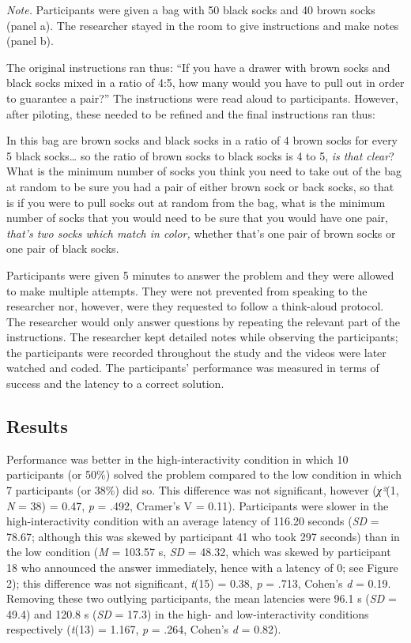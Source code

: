 \emph{Note.} Participants were given a bag with 50 black socks and 40
brown socks (panel a). The researcher stayed in the room to give
instructions and make notes (panel b).

The original instructions ran thus: ``If you have a drawer with brown
socks and black socks mixed in a ratio of 4:5, how many would you have
to pull out in order to guarantee a pair?'' The instructions were read
aloud to participants. However, after piloting, these needed to be
refined and the final instructions ran thus:

In this bag are brown socks and black socks in a ratio of 4 brown socks
for every 5 black socks\ldots{} so the ratio of brown socks to black
socks is 4 to 5, \emph{is that clear}? What is the minimum number of
socks you think you need to take out of the bag at random to be sure you
had a pair of either brown sock or back socks, so that is if you were to
pull socks out at random from the bag, what is the minimum number of
socks that you would need to be sure that you would have one pair,
\emph{that's two socks which match in color,} whether that's one pair of
brown socks or one pair of black socks.

Participants were given 5 minutes to answer the problem and they were
allowed to make multiple attempts. They were not prevented from speaking
to the researcher nor, however, were they requested to follow a
think-aloud protocol. The researcher would only answer questions by
repeating the relevant part of the instructions. The researcher kept
detailed notes while observing the participants; the participants were
recorded throughout the study and the videos were later watched and
coded. The participants' performance was measured in terms of success
and the latency to a correct solution.

\hypertarget{results}{%
\subsection{Results}\label{results}}

Performance was better in the high-interactivity condition in which 10
participants (or 50\%) solved the problem compared to the low condition
in which 7 participants (or 38\%) did so. This difference was not
significant, however (\emph{χ²}(1, \emph{N} = 38) = 0.47, \emph{p} =
.492, Cramer's V = 0.11). Participants were slower in the
high-interactivity condition with an average latency of 116.20 seconds
(\emph{SD} = 78.67; although this was skewed by participant 41 who took
297 seconds) than in the low condition (\emph{M} = 103.57 s, \emph{SD} =
48.32, which was skewed by participant 18 who announced the answer
immediately, hence with a latency of 0; see Figure 2); this difference
was not significant, \emph{t}(15) = 0.38, \emph{p} = .713, Cohen's
\emph{d} = 0.19. Removing these two outlying participants, the mean
latencies were 96.1 s (\emph{SD} = 49.4) and 120.8 s (\emph{SD} = 17.3)
in the high- and low-interactivity conditions respectively (\emph{t}(13)
= 1.167, \emph{p} = .264, Cohen's \emph{d} = 0.82).

